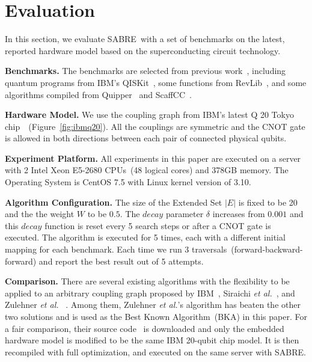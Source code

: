 \documentclass[journal,10pt,twocolumn]{IEEEtran}
\newcommand{\myalgorithmname}{SABRE}
\begin{document}
\section{Evaluation}\label{sec:evaluation}
In this section, we evaluate \myalgorithmname~with a set of benchmarks on the latest, reported hardware model based on the superconducting circuit technology.



\textbf{Benchmarks.} 
The benchmarks are selected from previous work~\cite{siraichi2018qubit,zulehner2018efficient}, including quantum programs from IBM's QISKit~\cite{IBMqiskit}, some functions from RevLib~\cite{wille2008revlib}, and some algorithms compiled from Quipper~\cite{green2013quipper} and ScaffCC~\cite{javadiabhari2014scaffcc}. 

\textbf{Hardware Model.} %
We use the coupling graph from IBM's latest Q 20 Tokyo chip~\cite{IBMdevice}~(Figure~\ref{fig:ibmq20}). 
All the couplings are symmetric and the CNOT gate is allowed in both directions between each pair of connected physical qubits.

\textbf{Experiment Platform.} All experiments in this paper are executed on a server with 2 Intel Xeon E5-2680 CPUs~(48 logical cores) and 378GB memory. The Operating System is CentOS 7.5 with Linux kernel version of 3.10.

\textbf{Algorithm Configuration.} The size of the Extended Set $|E|$ is fixed to be 20 and the the weight $W$ to be $0.5$. The $decay$ parameter $\delta$ increases from $0.001$ and this $decay$ function is reset every 5 search steps or after a CNOT gate is executed.
The algorithm is executed for 5 times, each with a different initial mapping for each benchmark. Each time we run 3 traversals~(forward-backward-forward) and report the best result out of 5 attempts.

\textbf{Comparison.} There are several existing algorithms with the flexibility to be applied to an arbitrary coupling graph proposed by IBM~\cite{IBMqiskit}, Siraichi \textit{et al.}~\cite{siraichi2018qubit}, and Zulehner \textit{et al.} ~\cite{zulehner2018efficient}.
Among them, Zulehner \textit{et al.}'s algorithm has beaten the other two solutions and is used as the Best Known Algorithm~(BKA) in this paper.
For a fair comparison, their source code~\cite{robertsolution} is downloaded and only the embedded hardware model is modified to be the same IBM 20-qubit chip model. It is then recompiled with full optimization, and executed on the same server with \myalgorithmname.
\end{document}
